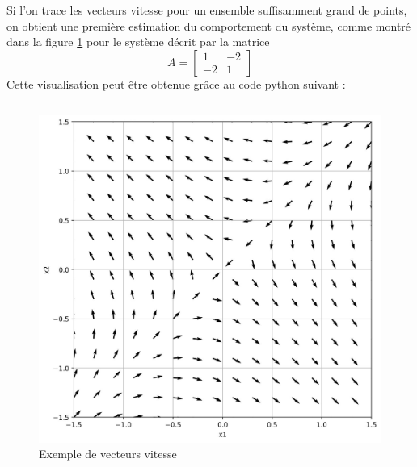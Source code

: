         Si l'on trace les vecteurs vitesse pour un ensemble suffisamment grand de points, on obtient une première estimation du comportement du système, comme montré dans la figure \ref{fig:vecteurs_vitesse} pour le système décrit par la matrice 
        \begin{equation}
            A = \begin{bmatrix}1 & -2\\-2 & 1\end{bmatrix}
        \end{equation}
        Cette visualisation peut être obtenue grâce au code python suivant :
        \inputminted{python}{codes/vecteurs_vitesse.py}
        
        \begin{figure}[ht!]
            \centering
            \includegraphics[width=\textwidth]{images/vecteurs_vitesse.jpg}
            \caption{Exemple de vecteurs vitesse}
            \label{fig:vecteurs_vitesse}
        \end{figure}

    
